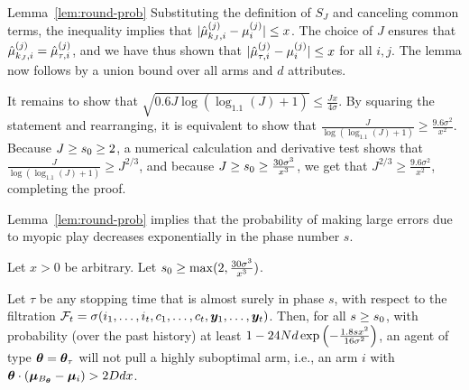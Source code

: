 \begin{extraproof}{Lemma~\ref{lem:round-prob}}
Substituting the definition of $S_J$ and canceling common terms,
the inequality implies that
$|\hat{\mu}_{k_J,i}^{(j)} - \mu_{i}^{(j)}| \leq x$.
The choice of $J$ ensures that
$\hat{\mu}_{k_J,i}^{(j)} = \hat{\mu}_{\tau,i}^{(j)}$,
and we have thus shown that
$|\hat{\mu}_{\tau,i}^{(j)} - \mu_{i}^{(j)}| \leq x$ for all $i,j$.
The lemma now follows by a union bound over all \ARMNUM arms and $d$
attributes.

It remains to show that
$\sqrt{0.6 J \log (\log_{1.1}(J) + 1)} \leq \frac{J x}{4 \sigma}$.
By squaring the statement and rearranging, it is equivalent to show that
$\frac{J}{\log(\log_{1.1}(J)+1)} \geq \frac{9.6\sigma^2}{x^2}$.
Because $J \geq s_0 \geq 2$,
a numerical calculation and derivative test shows that
$\frac{J}{\log(\log_{1.1}(J)+1)} \geq J^{2/3}$,
and because $J \geq s_0 \geq \frac{30 \sigma^3}{x^3}$,
we get that
$J^{2/3} \geq \frac{9.6 \sigma^2}{x^2}$, completing the proof.
\end{extraproof}


Lemma~\ref{lem:round-prob} implies that the probability of making
large errors due to myopic play decreases exponentially in the phase
number $s$.

\begin{corollary} \label{cor:right-choice}
Let $x > 0$ be arbitrary.
Let $s_0 \geq \max (2, \frac{30 \sigma^3}{x^3})$.

Let $\tau$ be any stopping time that is almost surely  in phase $s$,
with respect to the filtration
$\mathcal{F}_{t} = \sigma (i_{1}, \ldots, i_{t},
                          c_{1}, \ldots, c_{t},
                          \bm{y}_{1}, \ldots, \bm{y}_{t})$.
Then, for all $s \geq s_0$,
with probability (over the past history) at least 
$1 - 24 N d \exp\left(-\frac{1.8 s x^2}{16 \sigma^2} \right)$,
an agent of type $\bm{\theta} = \bm{\theta}_{\tau}$ 
will not pull a highly suboptimal arm, i.e., an arm $i$ with 
$\bm{\theta} \cdot (\bm{\mu}_{B_{\bm{\theta}}} - \bm{\mu}_{i}) > 2D d x$.
\end{corollary}

